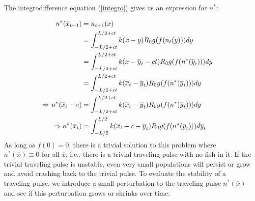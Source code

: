 \documentclass[12pt,english]{article}
\begin{document}
The integrodifference equation (\ref{integro}) gives us an expression for $n^*$:

\begin{align}
n^*(\overline{x}_{t+1})&=n_{t+1}(x) \notag
\\ &=\int_{-L/2+ct}^{L/2+ct}k(x-y)R_0g(f(n_t(y)))dy \notag
\\ &=\int_{-L/2+ct}^{L/2+ct}k(x-\overline{y}_t-ct)R_0g(f(n^*(\overline{y}_t)))dy \notag
\\ &=\int_{-L/2+ct}^{L/2+ct}k(\overline{x}_t-\overline{y}_t)R_0g(f(n^*(\overline{y}_t)))dy \notag
\\ \Rightarrow n^*(\overline{x}_t-c)&=\int_{-L/2+ct}^{L/2+ct}k(\overline{x}_t-\overline{y}_t)R_0g(f(n^*(\overline{y}_t)))dy \notag
\\ \Rightarrow n^*(\overline{x}_t)&=\int_{-L/2}^{L/2}k(\overline{x}_t+c-\overline{y}_t)R_0g(f(n^*(\overline{y}_t)))d\overline y_t  \label{pulse}
\end{align}
As long as $f(0)=0$, there is a trivial solution to this problem where $n^*(\overline{x})\equiv 0$ for all $\overline{x}$, i.e., there is a trivial traveling pulse with no fish in it.  If the trivial traveling pulse is unstable, even very small populations will persist or grow and avoid crashing back to the trivial pulse.  To evaluate the stability of a traveling pulse, we introduce a small perturbation to the traveling pulse $n^*(\overline{x})$ and see if this perturbation grows or shrinks over time:
\end{document}
